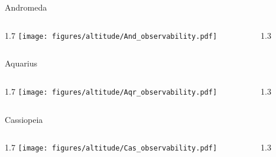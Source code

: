 \documentclass[final]{beamer}
\newlength{\colwidth}
\begin{document}

\begin{frame}[t]{}
    \Large{Andromeda}
    \begin{columns}[T]
        \begin{column}{1.7\colwidth}
            \centering
            \texttt{[image: figures/altitude/And\_observability.pdf]}
        \end{column}
        \begin{column}{1.3\colwidth}
            \Large
            
        \end{column}
    \end{columns}

    \Large{Aquarius}
    \begin{columns}[T]
        \begin{column}{1.7\colwidth}
            \centering
            \texttt{[image: figures/altitude/Aqr\_observability.pdf]}
        \end{column}
        \begin{column}{1.3\colwidth}
            \Large
            
        \end{column}
    \end{columns}

    \Large{Cassiopeia}
    \begin{columns}[T]
        \begin{column}{1.7\colwidth}
            \centering
            \texttt{[image: figures/altitude/Cas\_observability.pdf]}
        \end{column}
        \begin{column}{1.3\colwidth}
            \Large
            
        \end{column}
    \end{columns}
\end{frame}

\end{document}
